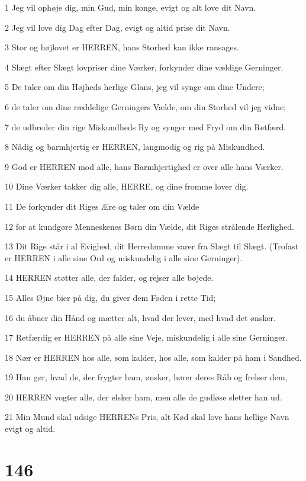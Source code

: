 \par 1 Jeg vil ophøje dig, min Gud, min konge, evigt og alt love dit Navn.
\par 2 Jeg vil love dig Dag efter Dag, evigt og altid prise dit Navn.
\par 3 Stor og højlovet er HERREN, hans Storhed kan ikke ransages.
\par 4 Slægt efter Slægt lovpriser dine Værker, forkynder dine vældige Gerninger.
\par 5 De taler om din Højheds herlige Glans, jeg vil synge om dine Undere;
\par 6 de taler om dine ræddelige Gerningers Vælde, om din Storhed vil jeg vidne;
\par 7 de udbreder din rige Miskundheds Ry og synger med Fryd om din Retfærd.
\par 8 Nådig og barmhjertig er HERREN, langmodig og rig på Miskundhed.
\par 9 God er HERREN mod alle, hans Barmhjertighed er over alle hans Værker.
\par 10 Dine Værker takker dig alle, HERRE, og dine fromme lover dig.
\par 11 De forkynder dit Riges Ære og taler om din Vælde
\par 12 for at kundgøre Menneskenes Børn din Vælde, dit Riges strålende Herlighed.
\par 13 Dit Rige står i al Evighed, dit Herredømme varer fra Slægt til Slægt. (Trofast er HERREN i alle sine Ord og miskundelig i alle sine Gerninger).
\par 14 HERREN støtter alle, der falder, og rejser alle bøjede.
\par 15 Alles Øjne bier på dig, du giver dem Føden i rette Tid;
\par 16 du åbner din Hånd og mætter alt, hvad der lever, med hvad det ønsker.
\par 17 Retfærdig er HERREN på alle sine Veje, miskundelig i alle sine Gerninger.
\par 18 Nær er HERREN hos alle, som kalder, hos alle, som kalder på ham i Sandhed.
\par 19 Han gør, hvad de, der frygter ham, ønsker, hører deres Råb og frelser dem,
\par 20 HERREN vogter alle, der elsker ham, men alle de gudløse sletter han ud.
\par 21 Min Mund skal udsige HERRENs Pris, alt Kød skal love hans hellige Navn evigt og altid.

\chapter{146}

